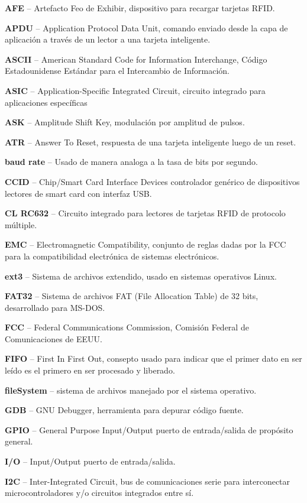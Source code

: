 \begin{glosario}

{\bf{AFE}} – Artefacto Feo de Exhibir, dispositivo para recargar tarjetas RFID. 

{\bf{APDU}} –  Application Protocol Data Unit, comando enviado desde la capa de aplicación a través de un lector a una tarjeta inteligente.

{\bf{ASCII}} – American Standard Code for Information Interchange, Código Estadounidense Estándar para el Intercambio de Información.

{\bf{ASIC}} – Application-Specific Integrated Circuit, circuito integrado para aplicaciones específicas

{\bf{ASK}} – Amplitude Shift Key, modulación por amplitud de pulsos.

{\bf{ATR}} – Answer To Reset, respuesta de una tarjeta inteligente luego de un reset.

{\bf{baud rate}} – Usado de manera analoga a la tasa de bits por segundo.

{\bf{CCID}} – Chip/Smart Card Interface Devices controlador genérico de dispositivos lectores de smart card con interfaz USB.

{\bf{CL RC632}} – Circuito integrado para lectores de tarjetas RFID de protocolo múltiple.

{\bf{EMC}} – Electromagnetic Compatibility, conjunto de reglas dadas por la FCC para la compatibilidad electrónica de sistemas electrónicos.

{\bf{ext3}} – Sistema de archivos extendido, usado en sistemas operativos Linux.

{\bf{FAT32}} – Sistema de archivos FAT (File Allocation Table) de 32 bits, desarrollado para MS-DOS.

{\bf{FCC}} – Federal Communications Commission, Comisión Federal de Comunicaciones de EEUU.

{\bf{FIFO}}  – First In First Out, consepto usado para indicar que el primer dato en ser leído es el primero en ser procesado y liberado.

{\bf{fileSystem}} – sistema de archivos manejado por el sistema operativo.

{\bf{GDB}} – GNU Debugger,  herramienta para depurar código fuente.

{\bf{GPIO}} – General Purpose Input/Output  puerto de entrada/salida de propósito general.

{\bf{I/O}} – Input/Output puerto de entrada/salida.

{\bf{I2C}} – Inter-Integrated Circuit, bus de comunicaciones serie para interconectar microcontroladores y/o circuitos integrados entre sí.


\end{glosario}
